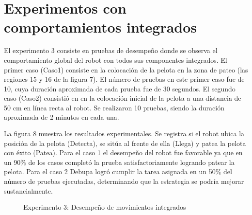 \documentclass[conference, letterpaper]{IEEEtranMC1}
\begin{document}
\section{Experimentos con comportamientos integrados}
\label{sec:experimentosintegrados}

El experimento 3 consiste en pruebas de desempeño donde se observa el comportamiento global del robot con todos sus componentes integrados. El  primer caso (Caso1) consiste en la colocación de la pelota  en la zona de pateo  (las regiones 15 y 16 de la figura 7). El número de pruebas en este primer caso fue de 10, cuya duración aproximada de cada prueba fue de 30 segundos.
El segundo caso  (Caso2) consistió en en la colocación inicial de la pelota a una distancia de 50 cm en línea recta al robot. Se realizaron 10 pruebas, siendo la duración aproximada de 2 minutos en cada una. 

La figura 8 muestra los resultados experimentales.  Se registra si el robot ubica la posición de la pelota (Detecta), se sitúa al frente de ella  (Llega) y patea la pelota con éxito (Patea). Para el caso 1 el desempeño del robot fue favorable ya que en un 90\% de los casos completó la prueba satisfactoriamente logrando patear la pelota. Para el caso 2 Debupa logró cumplir la tarea asignada en un 50\% del número de pruebas ejecutadas, determinando que la estrategia se podría mejorar sustancialmente.



\begin{figure}

\caption{Experimento 3: Desempe\~no de movimientos integrados}
\end{figure} 
\end{document}
